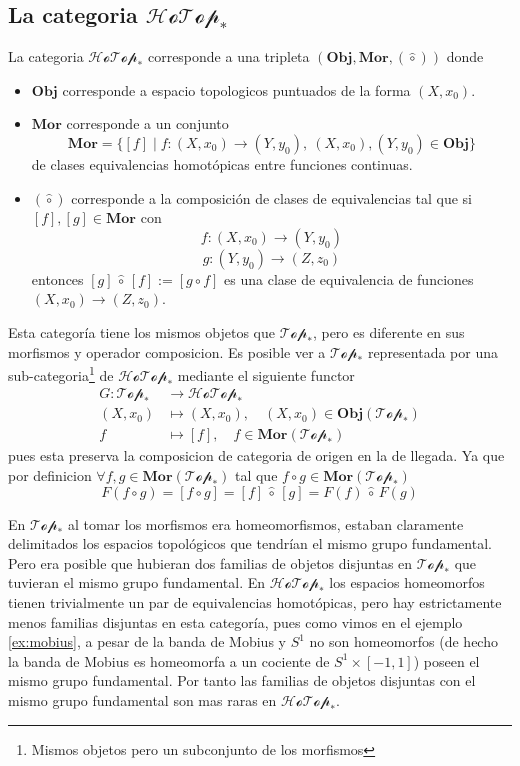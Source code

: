 \subsection{La categoria \(\mathscr{HoTop}_*\)}
\begin{definicion}
  La categoria \(\mathscr{HoTop}_*\) corresponde a una tripleta
  \((\mathbf{Obj},\mathbf {Mor}, (\hat \circ))\) donde
  \begin{itemize}
  \item \(\mathbf {Obj}\) corresponde a espacio topologicos puntuados de la
    forma \((X, x_0)\).
  \item \(\mathbf {Mor}\) corresponde a un conjunto
    \[ \mathbf{Mor} = \{ [f] \mid f : (X,x_0) \to (Y,y_0),\
      (X,x_0),(Y,y_0) \in \mathbf {Obj} \}\]
    de clases equivalencias homotópicas entre funciones continuas.
  \item \((\hat \circ)\) corresponde a la composición de clases de
    equivalencias tal que si \([f] , [g] \in \mathbf {Mor} \) con
    \[ f : (X,x_0) \to (Y, y_0)\]
    \[ g : (Y, y_0) \to (Z, z_0)\]
    entonces \([g] \, \hat \circ \, [f] := [ g \circ f ] \) es una clase
    de equivalencia de funciones \((X, x_0) \to (Z, z_0)\).
  \end{itemize}
\end{definicion}
Esta categoría tiene los mismos objetos que \(\mathscr{Top}_*\), pero es
diferente en sus morfismos y operador composicion. Es posible ver a
\(\mathscr{Top}_*\) representada por una sub-categoria\footnote{Mismos
objetos pero un subconjunto de los morfismos} de \(\mathscr{HoTop}_*\)
mediante el siguiente functor
\begin{align*}
  G : \mathscr{Top}_* &\longrightarrow \mathscr{HoTop}_* \\
  \left( X , x_0 \right) &\longmapsto \left( X , x_0 \right), \quad
     \left( X, x_0 \right) \in \mathbf {Obj} \left( \mathscr{Top}_* \right) \\
  f &\longmapsto [f], \quad f \in \mathbf {Mor} \left( \mathscr{Top}_* \right)
\end{align*}
pues esta preserva la composicion de categoria de origen en la de
llegada. Ya que por definicion \(\forall f,g \in \mathbf {Mor}
(\mathscr{Top}_*)\) tal que \(f \circ g \in \mathbf {Mor}
(\mathscr{Top}_*)\)
\[ F(f \circ g) = [f \circ g] = [f] \, \hat \circ \, [g] = F(f) \, \hat
\circ \, F(g) \]

En \(\mathscr{Top}_*\) al tomar los morfismos era homeomorfismos,
estaban claramente delimitados los espacios topológicos que tendrían el
mismo grupo fundamental. Pero era posible que hubieran dos familias de
objetos disjuntas en \(\mathscr{Top}_*\) que tuvieran el mismo grupo
fundamental. En \(\mathscr{HoTop}_*\) los espacios homeomorfos tienen
trivialmente un par de equivalencias homotópicas, pero hay estrictamente
menos familias disjuntas en esta categoría, pues como vimos en el
ejemplo \ref{ex:mobius}, a pesar de la banda de Mobius y \(S^1\) no son
homeomorfos (de hecho la banda de Mobius es homeomorfa a un cociente de
\(S^1 \times [-1, 1]\)) poseen el mismo grupo fundamental. Por tanto las
familias de objetos disjuntas con el mismo grupo fundamental son mas
raras en \(\mathscr{HoTop}_*\).

